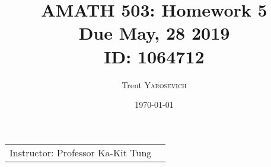 \documentclass{article}
\title{AMATH 503: Homework 5 \\Due May, 28 2019 \\ ID: 1064712} %
\author{Trent \textsc{Yarosevich}} %
\date{\today} %
\begin{document}
\maketitle %
\setlength\parindent{1cm}

\begin{center}
\begin{tabular}{l r}
Instructor: Professor Ka-Kit Tung %
\end{tabular}
\end{center}
\doublespacing

\end{document}
